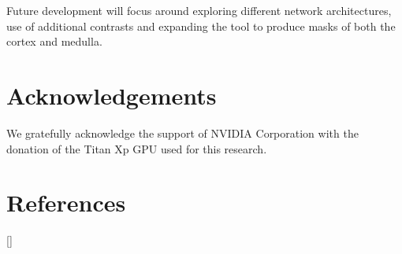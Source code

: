 Future development will focus around exploring different network architectures, use of additional contrasts and expanding the tool to produce masks of both the cortex and medulla.

\section{Acknowledgements}

We gratefully acknowledge the support of NVIDIA Corporation with the donation of the Titan Xp GPU used for this research.

\newpage
\section{References}
[\refname]{}
\printbibliography